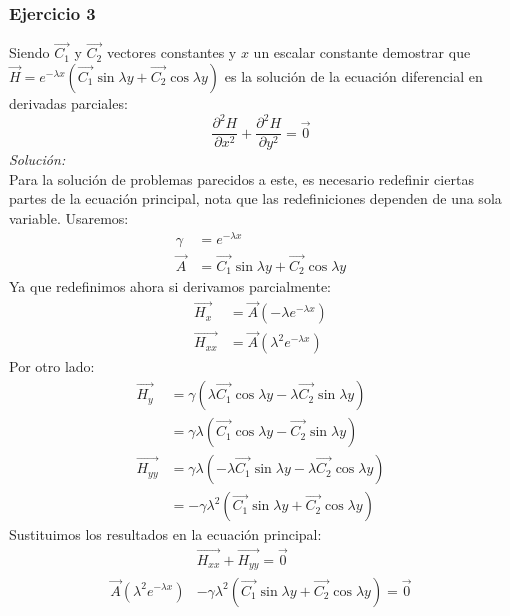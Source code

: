 \documentclass[12pt,openany]{book}
\begin{document}
			\subsubsection{Ejercicio 3}
				Siendo $\vec{C_{1}}$ y $\vec{C_{2}}$ vectores constantes y $x$ un escalar constante demostrar
				que $\vec{H}=e^{-\lambda x}\left(\vec{C_{1}}\sin\lambda y + \vec{C_{2}}\cos\lambda y \right)$ es la soluci\'on de
				la ecuaci\'on diferencial en derivadas parciales:
				$$
					\frac{\partial^{2}H}{\partial x^{2}}+\frac{\partial^{2}H}{\partial y^{2}}=\vec{0}
				$$
				\noindent\textsl{Soluci\'on:}\\
				Para la soluci\'on de problemas parecidos a este, es necesario redefinir ciertas partes de la ecuaci\'on principal, nota que las
				redefiniciones dependen de una sola variable.
				Usaremos:
				\begin{equation*}
					\begin{split}
						\gamma&=e^{-\lambda x}		\\
						\vec{A}&=\vec{C_{1}}\sin\lambda y + \vec{C_{2}}\cos\lambda y
					\end{split}
				\end{equation*}
				Ya que redefinimos ahora si derivamos parcialmente:
				\begin{equation*}
					\begin{split}
						\vec{H_{x}}&=\vec{A}\left(-\lambda e^{-\lambda x}\right)		\\
						\vec{H_{xx}}&=\vec{A}\left(\lambda^{2} e^{-\lambda x}\right)
					\end{split}
				\end{equation*}
				Por  otro lado:
				\begin{equation*}
					\begin{split}
						\vec{H_{y}}&=\gamma\left(\lambda\vec{C_{1}}\cos\lambda y-\lambda\vec{C_{2}}\sin\lambda y\right)	\\
								   &=\gamma\lambda\left(\vec{C_{1}}\cos\lambda y-\vec{C_{2}}\sin\lambda y\right)		\\
						\vec{H_{yy}}&=\gamma\lambda\left(-\lambda\vec{C_{1}}\sin\lambda y-\lambda\vec{C_{2}}\cos\lambda y\right)	\\
									&=-\gamma\lambda^{2}\left(\vec{C_{1}}\sin\lambda y+\vec{C_{2}}\cos\lambda y\right)
					\end{split}
				\end{equation*}
				Sustituimos los resultados en la ecuaci\'on principal:
				\begin{equation*}
					\begin{split}
						&\vec{H_{xx}}+\vec{H_{yy}}=\vec{0}		\\
						\vec{A}\left(\lambda^{2} e^{-\lambda x}\right)&-\gamma\lambda^{2}\left(\vec{C_{1}}\sin\lambda y+\vec{C_{2}}\cos\lambda y\right)=\vec{0}
					\end{split}
				\end{equation*}
\end{document}

